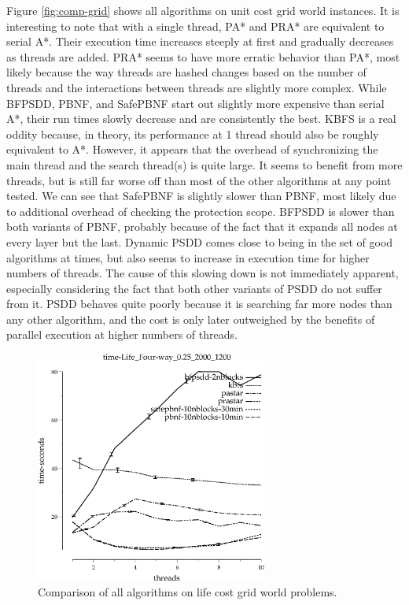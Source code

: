 \documentclass{article}
\begin{document}
Figure \ref{fig:comp-grid} shows all algorithms on unit cost grid world instances. It is interesting to note that with a single thread, PA* and PRA* are equivalent to serial A*. Their execution time increases steeply at first and gradually decreases as threads are added. PRA* seems to have more erratic behavior than PA*, most likely because the way threads are hashed changes based on the number of threads and the interactions between threads are slightly more complex. While BFPSDD, PBNF, and SafePBNF start out slightly more expensive than serial A*, their run times slowly decrease and are consistently the best. KBFS is a real oddity because, in theory, its performance at 1 thread should also be roughly equivalent to A*. However, it appears that the overhead of synchronizing the main thread and the search thread(s) is quite large. It seems to benefit from more threads, but is still far worse off than most of the other algorithms at any point tested. We can see that SafePBNF is slightly slower than PBNF, most likely due to additional overhead of checking the protection scope. BFPSDD is slower than both variants of PBNF, probably because of the fact that it expands all nodes at every layer but the last. Dynamic PSDD comes close to being in the set of good algorithms at times, but also seems to increase in execution time for higher numbers of threads. The cause of this slowing down is not immediately apparent, especially considering the fact that both other variants of PSDD do not suffer from it. PSDD behaves quite poorly because it is searching far more nodes than any other algorithm, and the cost is only later outweighed by the benefits of parallel execution at higher numbers of threads.

\begin{figure}[h!]
\includegraphics[width=3in]{../graphs/seth/time-Life_Four-way_0.25_2000_1200.eps}
\caption{Comparison of all algorithms on life cost grid world problems.}
\label{fig:comp-life}
\end{figure}
\end{document}
